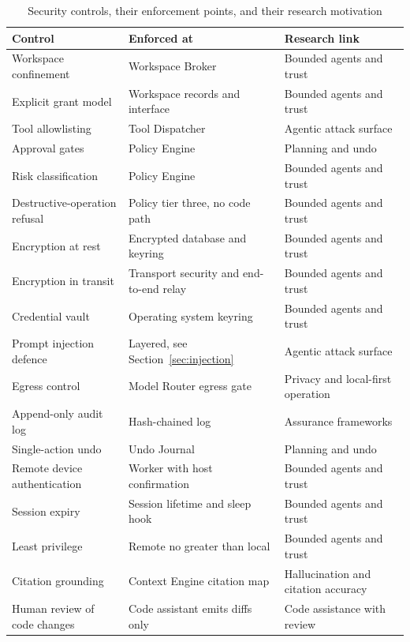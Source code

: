\documentclass[11pt]{article}
\begin{document}
\begin{table}[htbp]
\centering
\small
\caption{Security controls, their enforcement points, and their research motivation}
\label{tab:security}
\begin{tabular}{@{}p{}p{}p{}@{}}
\toprule
\textbf{Control} & \textbf{Enforced at} & \textbf{Research link} \\
\midrule
Workspace confinement & Workspace Broker & Bounded agents and trust \\
Explicit grant model & Workspace records and interface & Bounded agents and trust \\
Tool allowlisting & Tool Dispatcher & Agentic attack surface \\
Approval gates & Policy Engine & Planning and undo \\
Risk classification & Policy Engine & Bounded agents and trust \\
Destructive-operation refusal & Policy tier three, no code path & Bounded agents and trust \\
Encryption at rest & Encrypted database and keyring & Bounded agents and trust \\
Encryption in transit & Transport security and end-to-end relay & Bounded agents and trust \\
Credential vault & Operating system keyring & Bounded agents and trust \\
Prompt injection defence & Layered, see Section~\ref{sec:injection} & Agentic attack surface \\
Egress control & Model Router egress gate & Privacy and local-first operation \\
Append-only audit log & Hash-chained log & Assurance frameworks \\
Single-action undo & Undo Journal & Planning and undo \\
Remote device authentication & Worker with host confirmation & Bounded agents and trust \\
Session expiry & Session lifetime and sleep hook & Bounded agents and trust \\
Least privilege & Remote no greater than local & Bounded agents and trust \\
Citation grounding & Context Engine citation map & Hallucination and citation accuracy \\
Human review of code changes & Code assistant emits diffs only & Code assistance with review \\
\bottomrule
\end{tabular}
\end{table}
\end{document}
